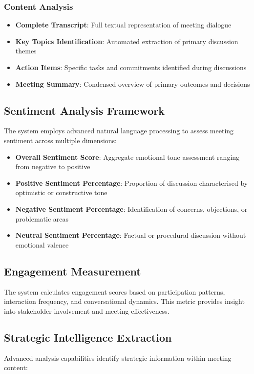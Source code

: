 \documentclass{article}
\begin{document}
\subsubsection{Content Analysis}
\begin{itemize}
    \item \textbf{Complete Transcript}: Full textual representation of meeting dialogue
    \item \textbf{Key Topics Identification}: Automated extraction of primary discussion themes
    \item \textbf{Action Items}: Specific tasks and commitments identified during discussions
    \item \textbf{Meeting Summary}: Condensed overview of primary outcomes and decisions
\end{itemize}

\subsection{Sentiment Analysis Framework}
The system employs advanced natural language processing to assess meeting sentiment across multiple dimensions:

\begin{itemize}
    \item \textbf{Overall Sentiment Score}: Aggregate emotional tone assessment ranging from negative to positive
    \item \textbf{Positive Sentiment Percentage}: Proportion of discussion characterised by optimistic or constructive tone
    \item \textbf{Negative Sentiment Percentage}: Identification of concerns, objections, or problematic areas
    \item \textbf{Neutral Sentiment Percentage}: Factual or procedural discussion without emotional valence
\end{itemize}

\subsection{Engagement Measurement}
The system calculates engagement scores based on participation patterns, interaction frequency, and conversational dynamics. This metric provides insight into stakeholder involvement and meeting effectiveness.

\subsection{Strategic Intelligence Extraction}
Advanced analysis capabilities identify strategic information within meeting content:
\end{document}
